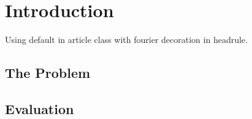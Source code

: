 \documentclass{article}
\begin{document}
\tableofcontents

\section{Introduction}

Using default in article class with fourier decoration in headrule.

\subsection{The Problem}
\label{sec:problem}

\lipsum[1]

\subsection{Evaluation}

\lipsum[3]
\end{document}
